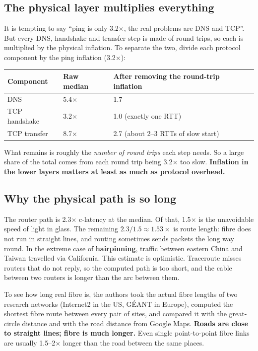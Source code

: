\subsection{The physical layer multiplies everything}
It is tempting to say ``ping is only 3.2$\times$, the real problems are DNS and TCP''. But every DNS, handshake and transfer step is made of round trips, so each is
multiplied by the physical inflation. To separate the two, divide each protocol component by the ping inflation (3.2$\times$):
\begin{center}
\begin{tabular}{@{}lll@{}}
\toprule
Component & Raw median & After removing the round-trip inflation\\
\midrule
DNS & 5.4$\times$ & 1.7\\
TCP handshake & 3.2$\times$ & 1.0 (exactly one RTT)\\
TCP transfer & 8.7$\times$ & 2.7 (about 2--3 RTTs of slow start)\\
\bottomrule
\end{tabular}
\end{center}
What remains is roughly the \emph{number of round trips} each step needs. So a large share of the total comes from each round trip being 3.2$\times$ too slow.
\textbf{Inflation in the lower layers matters at least as much as protocol overhead.}

\subsection{Why the physical path is so long}
The router path is 2.3$\times$ c-latency at the median. Of that, 1.5$\times$ is the unavoidable speed of light in glass. The remaining $2.3/1.5 \approx 1.53\times$ is
route length: fibre does not run in straight lines, and routing sometimes sends packets the long way round. In the extreme case of \textbf{hairpinning},
traffic between eastern China and Taiwan travelled via California. This estimate is optimistic. Traceroute misses routers that do not reply, so the
computed path is too short, and the cable between two routers is longer than the arc between them.


To see how long real fibre is, the authors took the actual fibre lengths of two research networks (Internet2 in the US, G\'EANT in Europe), computed the shortest
fibre route between every pair of sites, and compared it with the great-circle distance and with the road distance from Google Maps. \textbf{Roads are close to
straight lines; fibre is much longer.} Even single point-to-point fibre links are usually 1.5--2$\times$ longer than the road between the same places.

